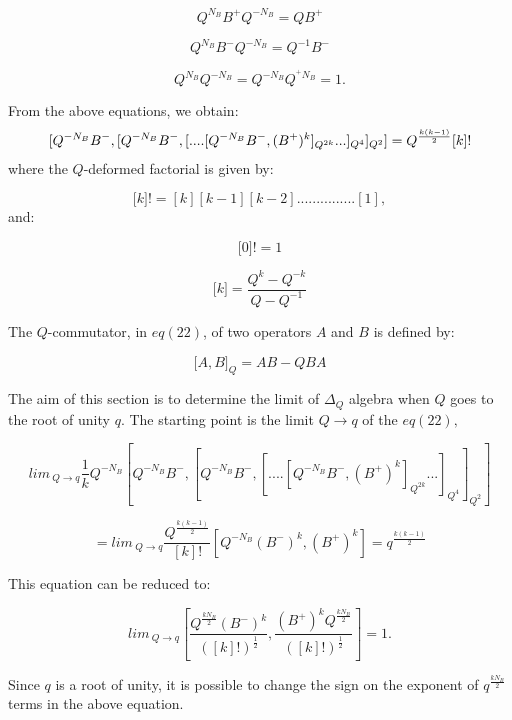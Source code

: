 \documentclass[a4paper,12pt,thmsa]{article}
\begin{document}
\begin{equation}
Q^{N_B}B^{+}Q^{-N_B}=QB^{+}
\end{equation}

\begin{equation}
Q^{N_B}B^{-}Q^{-N_B}=Q^{-1}B^{-}
\end{equation}

\begin{equation}
Q^{N_B}Q^{-N_B}=Q^{-N_B}Q^{^{+}N_B}=1.
\end{equation}

From the above equations, we obtain:
\begin{equation}
\lbrack
Q^{-N_B}B^{-},[Q^{-N_B}B^{-},[....[Q^{-N_B}B^{-},(B^{+})^k]_{Q^{2k}}...]_{Q^4}]_{Q^2}]=Q^{%
\frac{k(k-1)}2}[k]!
\end{equation}
where the $Q$-deformed factorial is given by:

\begin{equation}
\lbrack k]!=[k][k-1][k-2]...............[1],
\end{equation}
and:

\[
\lbrack 0]!=1
\]

\[
\lbrack k]=\frac{Q^k-Q^{-k}}{Q-Q^{-1}}
\]

The $Q$-commutator, in $eq(22)$, of two operators $A$ and $B$ is defined by:

\[
\lbrack A,B]_Q=AB-QBA
\]

The aim of this section is to determine the limit of $\Delta _Q$ algebra
when $Q$ goes to the root of unity $q$. The starting point is the limit $%
Q\rightarrow q$ of the $eq(22),$

\[
lim\, _{Q\rightarrow q}\frac
1kQ^{-N_B}[Q^{-N_B}B^{-},[Q^{-N_B}B^{-},[....[Q^{-N_B}B^{-},(B^{+})^k]_{Q^{2k}}...]_{Q^4}]_{Q^2}]
\]

\begin{equation}
=lim\, _{Q\rightarrow q}\frac{Q^{\frac{k(k-1)}2}}{[k]!}[%
Q^{-N_B}(B^{-})^k,(B^{+})^k]=q^{\frac{k(k-1)}2}
\end{equation}

This equation can be reduced to:

\begin{equation}
lim\, _{Q\rightarrow
q}[\frac{Q^{\frac{kN_B}2}(B^{-})^k}{([k]!)^{\frac
12}},\frac{(B^{+})^kQ^{\frac{kN_B}2}}{([k]!)^{\frac 12}}]=1.
\end{equation}

Since $q$ is a root of unity, it is possible to change the sign on the
exponent of $q^{\frac{kN_B}2}$ terms in the above equation.
\end{document}
